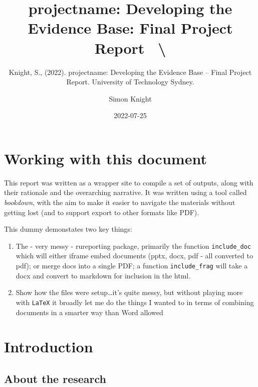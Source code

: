 \documentclass[
]{book}
\title{projectname: Developing the Evidence Base: Final Project Report ~\textbackslash{}}
\subtitle{Knight, S., (2022). projectname: Developing the Evidence Base -- Final Project Report. University of Technology Sydney.}
\author{Simon Knight}
\date{2022-07-25}
\providecommand{\tightlist}{%
  \setlength{\itemsep}{0pt}\setlength{\parskip}{0pt}}
\let\oldmaketitle\maketitle
\begin{document}
\maketitle


\newpage

\let\maketitle\oldmaketitle
\maketitle

{
\setcounter{tocdepth}{1}
\tableofcontents
}
\hypertarget{working-with-this-document}{%
\chapter{Working with this document}\label{working-with-this-document}}

This report was written as a wrapper site to compile a set of outputs, along with their rationale and the overarching narrative. It was written using a tool called \emph{bookdown}, with the aim to make it easier to navigate the materials without getting lost (and to support export to other formats like PDF).

This dummy demonstates two key things:

\begin{enumerate}
\def\labelenumi{\arabic{enumi}.}
\tightlist
\item
  The - very messy - rureporting package, primarily the function \texttt{include\_doc} which will either iframe embed documents (pptx, docx, pdf - all converted to pdf); or merge docs into a single PDF; a function \texttt{include\_frag} will take a docx and convert to markdown for inclusion in the html.
\item
  Show how the files were setup\ldots it's quite messy, but without playing more with \texttt{LaTeX} it broadly let me do the things I wanted to in terms of combining documents in a smarter way than Word allowed
\end{enumerate}

\hypertarget{intro}{%
\chapter{Introduction}\label{intro}}

\hypertarget{about-the-research}{%
\section{About the research}\label{about-the-research}}
\end{document}
